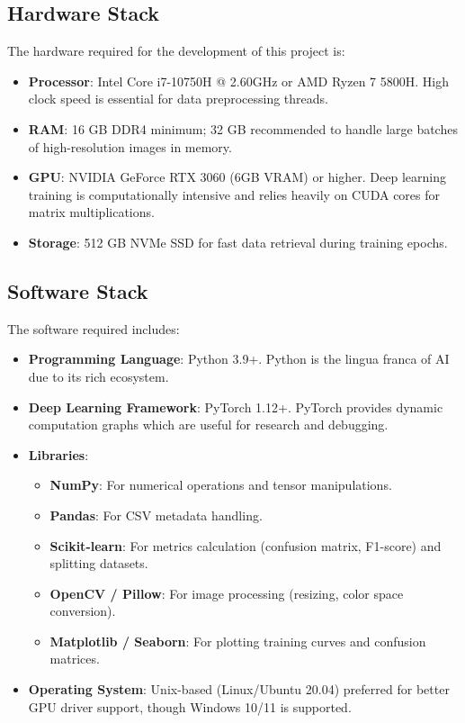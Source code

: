 \documentclass[twocolumn,10pt,a4paper]{article}
\begin{document}
\subsection{Hardware Stack}
The hardware required for the development of this project is:
\begin{itemize}
    \item \textbf{Processor}: Intel Core i7-10750H @ 2.60GHz or AMD Ryzen 7 5800H. High clock speed is essential for data preprocessing threads.
    \item \textbf{RAM}: 16 GB DDR4 minimum; 32 GB recommended to handle large batches of high-resolution images in memory.
    \item \textbf{GPU}: NVIDIA GeForce RTX 3060 (6GB VRAM) or higher. Deep learning training is computationally intensive and relies heavily on CUDA cores for matrix multiplications.
    \item \textbf{Storage}: 512 GB NVMe SSD for fast data retrieval during training epochs.
\end{itemize}

\subsection{Software Stack}
The software required includes:
\begin{itemize}
    \item \textbf{Programming Language}: Python 3.9+. Python is the lingua franca of AI due to its rich ecosystem.
    \item \textbf{Deep Learning Framework}: PyTorch 1.12+. PyTorch provides dynamic computation graphs which are useful for research and debugging.
    \item \textbf{Libraries}:
    \begin{itemize}
        \item \textbf{NumPy}: For numerical operations and tensor manipulations.
        \item \textbf{Pandas}: For CSV metadata handling.
        \item \textbf{Scikit-learn}: For metrics calculation (confusion matrix, F1-score) and splitting datasets.
        \item \textbf{OpenCV / Pillow}: For image processing (resizing, color space conversion).
        \item \textbf{Matplotlib / Seaborn}: For plotting training curves and confusion matrices.
    \end{itemize}
    \item \textbf{Operating System}: Unix-based (Linux/Ubuntu 20.04) preferred for better GPU driver support, though Windows 10/11 is supported.
\end{itemize}
\end{document}
